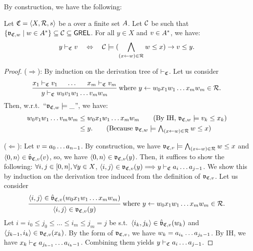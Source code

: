 By construction, we have the following:
\begin{lemma}\label{lemma: CFG}
    Let $\mathfrak{C} = \langle X, \mathcal{R}, s\rangle$ be a  over a finite set $A$.
    Let $\algclass$ be such that $\set{\val_{\CFG, \word} \mid \word \in \CSIG^*} \subseteq \algclass \subseteq \GREL$.
    For all $y \in X$ and $\word[2] \in \CSIG^*$, we have:
    \[y \vdash_{\CFG} \word[2] \quad\Leftrightarrow\quad \algclass \models (\bigwedge_{(x \leftarrow w) \in \mathcal{R}} w \le x) \to \word[2] \le y.\]
\end{lemma}
\begin{proof}
    ($\Rightarrow$):
    By induction on the derivation tree of $\vdash_{\mathfrak{C}}$.
    Let us consider \[\begin{prooftree}
                  \hypo{x_1 \vdash_{\CFG} \word[2]_1}
                  \hypo{\dots}
                  \hypo{x_m \vdash_{\CFG} \word[2]_m}
                  \infer3{y \vdash_{\CFG} \word[1]_0 \word[2]_1 \word[1]_1 \dots \word[2]_m \word[1]_m}
           \end{prooftree} \mbox{ where $y \leftarrow \word[1]_0 x_1 \word[1]_1 \dots x_m \word[1]_m \in \mathcal{R}$.}\]
    Then, w.r.t.\ ``$\val_{\CFG, \word} \models \bl$'',
    we have:
    \begin{align*}
        \word[1]_0 \word[2]_1 \word[1]_1 \dots \word[2]_m \word[1]_m & \le \word[1]_0 x_1 \word[1]_1 \dots x_m \word[1]_m \tag{By IH, $\val_{\CFG, \word} \models \word[2]_k \le x_k$}\\
        & \le y. \tag{Because $\val_{\CFG, \word} \models \bigwedge_{(x \leftarrow w) \in \mathcal{R}} w \le x$}
    \end{align*}

    ($\Leftarrow$):
    Let $\word[2] = a_0 \dots a_{n-1}$.
    By construction, we have $\val_{\CFG, \word[2]} \models \bigwedge_{(x \leftarrow w) \in \mathcal{R}} w \le x$ and $\tuple{0, n} \in \hat{\val}_{\CFG, \word[2]}(\word[2])$, so, we have $\tuple{0, n} \in \val_{\CFG, \word[2]}(y)$.
    Then, it suffices to show the following:
    $\forall i, j \in [0, n], \forall y \in X$, $\tuple{i, j} \in \val_{\CFG, \word[2]}(y) \Longrightarrow y \vdash_{\CFG} a_i \dots a_{j-1}$.
    We show this by induction on the derivation tree induced from the definition of $\val_{\CFG, \word[2]}$.
    Let us consider
    \[\begin{prooftree}
        \hypo{\tuple{i, j} \in \hat{\val}_{\CFG, \word[2]}(\word[1]_0 x_1 \word[1]_1 \dots x_m \word[1]_m)}
        \infer1{\tuple{i, j} \in \val_{\CFG, \word[2]}(y)}
    \end{prooftree} \mbox{ where $y \leftarrow \word[1]_0 x_1 \word[1]_1 \dots x_m \word[1]_m \in \mathcal{R}$.}\]
    Let $i = i_0 \le j_0 \le \dots \le i_{m} \le j_{m} = j$ be s.t.\
    $\tuple{i_k, j_k} \in \hat{\val}_{\CFG, \word[2]}(\word[1]_k)$ and
    $\tuple{j_{k-1}, i_k} \in \val_{\CFG, \word[2]}(x_k)$.
    By the form of $\val_{\CFG, \word[2]}$, we have $\word[1]_k = a_{i_k} \dots a_{j_k-1}$.
    By IH, we have $x_k \vdash_{\mathfrak{C}} a_{j_{k-1}} \dots a_{i_k-1}$.
    Combining them yields $y \vdash_{\mathfrak{C}} a_{i} \dots a_{j-1}$.
\end{proof}
